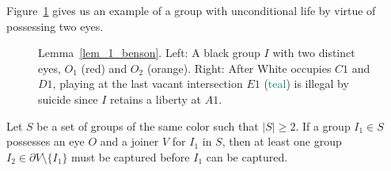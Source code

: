 Figure~\ref{fig:lem_1_benson} gives us an example of a group with unconditional life by virtue of possessing two eyes.

\begin{figure}[H]
	\centering
	\begin{goban}[7, hoshi = false]
	\end{goban}
	\quad
	\begin{goban}[7, hoshi = false]
	\end{goban}
	\caption{Lemma~\ref{lem_1_benson}. Left: A black group $I$ with two distinct eyes, $O_1$ (\textcolor{sealred}{red}) and $O_2$ (\textcolor{terracotta}{orange}). Right: After White occupies $C1$ and $D1$, playing at the last vacant intersection $E1$ (\textcolor{teal}{teal}) is illegal by suicide since $I$ retains a liberty at $A1$.}
	\label{fig:lem_1_benson}
\end{figure}

\begin{lemma}\label{lem_2_benson}
	Let $S$ be a set of groups of the same color such that $|S| \ge 2$. If a group $I_1 \in S$ possesses an eye $O$ and a joiner $V$ for $I_1$ in $S$, then at least one group $I_2 \in \partial V \setminus \{I_1\}$ must be captured before $I_1$ can be captured.
\end{lemma}

